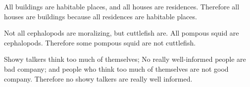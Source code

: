 \begin{exercises}

\item All buildings are habitable places, and all houses are residences. Therefore all houses are buildings because all residences are habitable places.



\item Not all cephalopods are moralizing, but cuttlefish are. All pompous squid are cephalopods. Therefore some pompous squid are not cuttlefish.

%



\item \label{itm:talkers} Showy talkers think too much of themselves; No really well-informed people are bad company; and people who think too much of themselves are not good company. Therefore no showy talkers are really well informed. %





\end{exercises}
